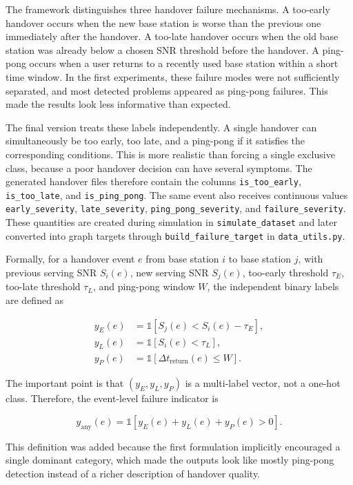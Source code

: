 \documentclass[11pt, a4paper, twoside]{article}
\begin{document}
The framework distinguishes three handover failure mechanisms. A too-early handover occurs when the new base station is worse than the previous one immediately after the handover. A too-late handover occurs when the old base station was already below a chosen SNR threshold before the handover. A ping-pong occurs when a user returns to a recently used base station within a short time window. In the first experiments, these failure modes were not sufficiently separated, and most detected problems appeared as ping-pong failures. This made the results look less informative than expected.

The final version treats these labels independently. A single handover can simultaneously be too early, too late, and a ping-pong if it satisfies the corresponding conditions. This is more realistic than forcing a single exclusive class, because a poor handover decision can have several symptoms. The generated handover files therefore contain the columns \texttt{is\_too\_early}, \texttt{is\_too\_late}, and \texttt{is\_ping\_pong}. The same event also receives continuous values \texttt{early\_severity}, \texttt{late\_severity}, \texttt{ping\_pong\_severity}, and \texttt{failure\_severity}. These quantities are created during simulation in \texttt{simulate\_dataset} and later converted into graph targets through \texttt{build\_failure\_target} in \texttt{data\_utils.py}.

Formally, for a handover event $e$ from base station $i$ to base station $j$, with previous serving SNR $S_i(e)$, new serving SNR $S_j(e)$, too-early threshold $\tau_E$, too-late threshold $\tau_L$, and ping-pong window $W$, the independent binary labels are defined as

\begin{align}
y_E(e) &= \mathbb{1}\left[S_j(e) < S_i(e) - \tau_E\right], \\
y_L(e) &= \mathbb{1}\left[S_i(e) < \tau_L\right], \\
y_P(e) &= \mathbb{1}\left[\Delta t_{\text{return}}(e) \leq W\right].
\end{align}

The important point is that $(y_E, y_L, y_P)$ is a multi-label vector, not a one-hot class. Therefore, the event-level failure indicator is

\begin{equation}
y_{\text{any}}(e) = \mathbb{1}\left[y_E(e) + y_L(e) + y_P(e) > 0\right].
\end{equation}

This definition was added because the first formulation implicitly encouraged a single dominant category, which made the outputs look like mostly ping-pong detection instead of a richer description of handover quality.
\end{document}
